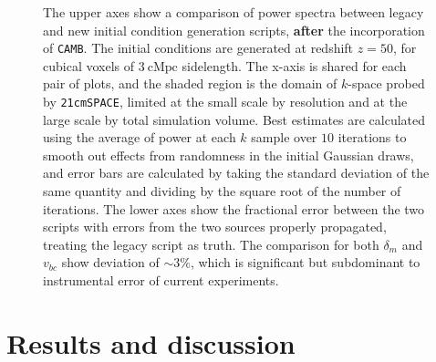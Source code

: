 \documentclass[floats,floatfix,showpacs,amssymb,prd,superscriptaddress,nofootinbib, 11pt]{revtex4-2} %
\newcommand{\code}{\texttt}
\begin{document}
\begin{figure}[H]
        \caption{The upper axes show a comparison of power spectra between legacy and new initial condition generation scripts, \textbf{after} the incorporation of \code{CAMB}. The initial conditions are generated at redshift $z = 50$, for cubical voxels of $3 ~\text{cMpc}$ sidelength. The x-axis is shared for each pair of plots, and the shaded region is the domain of $k$-space probed by \code{21cmSPACE}, limited at the small scale by resolution and at the large scale by total simulation volume. Best estimates are calculated using the average of power at each $k$ sample over $10$ iterations to smooth out effects from randomness in the initial Gaussian draws, and error bars are calculated by taking the standard deviation of the same quantity and dividing by the square root of the number of iterations. The lower axes show the fractional error between the two scripts with errors from the two sources properly propagated, treating the legacy script as truth. The comparison for both $\delta_m$ and $v_{bc}$ show deviation of $\sim 3 \%$, which is significant but subdominant to instrumental error of current experiments.}
        \label{fig:compare_generators}
\end{figure}



\newpage
\section{Results and discussion}
\end{document}
